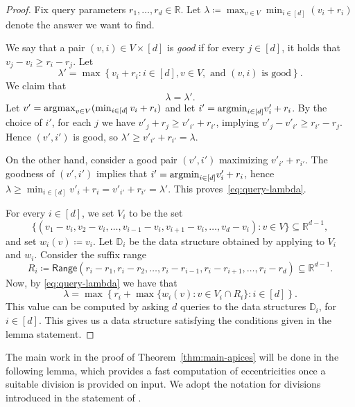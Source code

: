 \begin{proof}
    Fix query parameters $r_1, \dots, r_d \in \mathbb{R}$.
    Let $\lambda \coloneqq \max_{v \in V} \min_{i \in [d]} (v_i + r_i)$ denote the answer we want to find.
    
    We say that a pair $(v,i) \in V \times [d]$ is \emph{good} if
    for every $j \in [d]$, it holds that $v_j - v_i \geq r_i -r_j$.
    Let
    $$
    		\lambda' = \max \left\{ v_i + r_i \colon i\in [d], v\in V,\textrm{ and }(v,i)\textrm{ is good} \right\}.
    $$
    We claim that 
    \begin{equation}
    \label{eq:query-lambda}
    \lambda = \lambda'.
   \end{equation}
   Let $v' = \text{argmax}_{v \in V} (\min_{i \in [d]} v_i + r_i)$ and let $i' = \text{argmin}_{i \in [d]} v'_i + r_i$. By the choice of $i'$, for each $j$ we have $v'_j+r_j\geq v'_{i'}+r_{i'}$, implying $v'_j - v'_{i'} \geq r_{i'} - r_j$. Hence $(v',i')$ is good, so $\lambda' \geq v'_{i'} + r_{i'} = \lambda$.
    
    On the other hand, consider a good pair $(v', i')$ maximizing $v'_{i'} + r_{i'}$.
    The goodness of $(v',i')$ implies that $i' = \text{argmin}_{i \in [d]} v'_i + r_i$, hence $\lambda \geq \min_{i \in [d]} v'_i + r_i = v'_{i'} + r_{i'} = \lambda'$. This proves~\eqref{eq:query-lambda}.
    
    For every $i \in [d]$, we set $V_i$ to be the set
    $$ 
    		\{ (v_1 - v_i, v_2 - v_i, \dots, v_{i - 1} - v_i, v_{i + 1} - v_i, \dots, v_d - v_i) : v \in V \}\subseteq \mathbb{R}^{d-1},
    	$$
    	and set $w_i(v) \coloneqq v_i$. Let $\mathbb{D}_i$ be the data structure obtained by applying  to $V_i$ and $w_i$. Consider the suffix range
    $$
    		R_i\coloneqq \mathsf{Range}(r_i - r_1, r_i-r_2, \dots, r_i - r_{i - 1}, r_i - r_{i + 1}, \dots,  r_i - r_d)\subseteq \mathbb{R}^{d-1}.
    $$
    Now, by \eqref{eq:query-lambda} we have that
    $$
    		\lambda = \max \left\{ r_i + \max \{ w_i(v) : v \in V_i \cap R_i \}\colon i\in [d] \right\}.
    $$
    This value can be computed by asking $d$ queries to the data structures $\mathbb{D}_i$, for $i\in [d]$. This gives us a data structure satisfying the conditions given in the lemma statement.
\end{proof}

The main work in the proof of Theorem~\ref{thm:main-apices} will be done in the following lemma,
which provides a fast computation of eccentricities once a suitable division is provided on input.
We adopt the notation for divisions introduced in the statement of .

